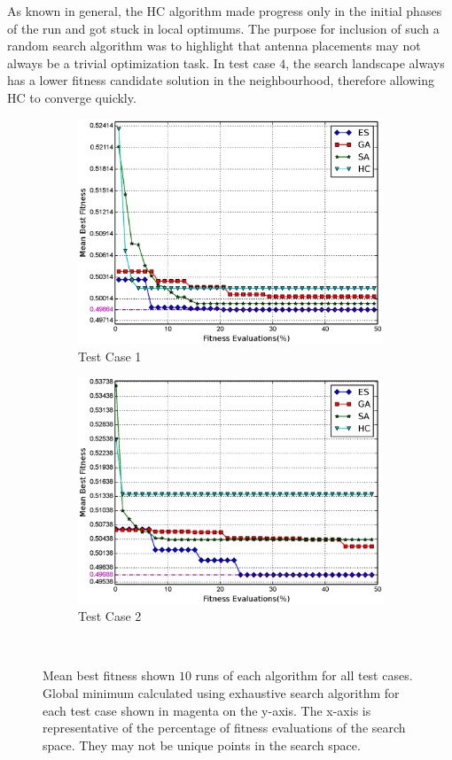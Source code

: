 \documentclass[conference]{IEEEtran}
\begin{document}
As known in general, the HC algorithm made progress only in the initial phases of the run and got stuck in local optimums. The purpose for inclusion of such a random search algorithm was to highlight that antenna placements may not always be a trivial optimization task. In test case $4$, the search landscape always has a lower fitness candidate solution in the neighbourhood, therefore allowing HC to converge quickly.

\begin{figure}%
    \centering
    \begin{subfigure}{\columnwidth}
        \includegraphics[width=\columnwidth]{FIG/tc1_mf.eps}%
        \caption{Test Case 1}%
    \label{fig:tc1_mf}%
    \end{subfigure}\hfill%
    \begin{subfigure}{\columnwidth}
        \includegraphics[width=\columnwidth]{FIG/tc2_mf.eps}%
        \caption{Test Case 2}%
        \label{fig:tc2_mf}%
    \end{subfigure}\hfill\\
    \caption{Mean best fitness shown $10$ runs of each algorithm for all test cases. Global minimum calculated using exhaustive search algorithm for each test case shown in magenta on the y-axis. The x-axis is representative of the percentage of fitness evaluations of the search space. They may not be unique points in the search space.}
\end{figure}
\end{document}
